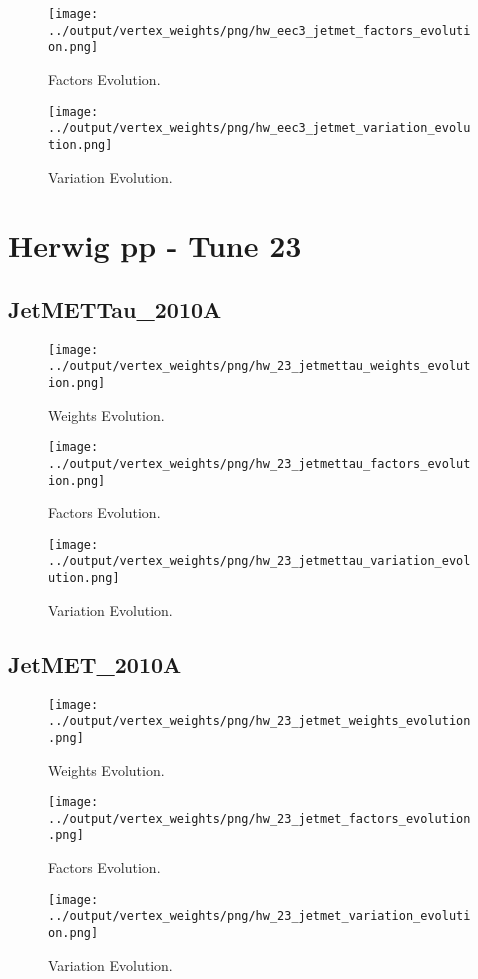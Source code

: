\documentclass[11pt]{book}
\begin{document}
\begin{figure}[ht]
\centering
\texttt{[image: ../output/vertex\_weights/png/hw\_eec3\_jetmet\_factors\_evolution.png]}
\caption{Factors Evolution.}
\end{figure}

\begin{figure}[ht]
\centering
\texttt{[image: ../output/vertex\_weights/png/hw\_eec3\_jetmet\_variation\_evolution.png]}
\caption{Variation Evolution.}
\end{figure}
\clearpage


\section{Herwig pp - Tune 23}
\subsection{JetMETTau\_2010A}
\begin{figure}[ht]
\centering
\texttt{[image: ../output/vertex\_weights/png/hw\_23\_jetmettau\_weights\_evolution.png]}
\caption{Weights Evolution.}
\end{figure}

\begin{figure}[ht]
\centering
\texttt{[image: ../output/vertex\_weights/png/hw\_23\_jetmettau\_factors\_evolution.png]}
\caption{Factors Evolution.}
\end{figure}

\begin{figure}[ht]
\centering
\texttt{[image: ../output/vertex\_weights/png/hw\_23\_jetmettau\_variation\_evolution.png]}
\caption{Variation Evolution.}
\end{figure}
\clearpage


\subsection{JetMET\_2010A}
\begin{figure}[ht]
\centering
\texttt{[image: ../output/vertex\_weights/png/hw\_23\_jetmet\_weights\_evolution.png]}
\caption{Weights Evolution.}
\end{figure}

\begin{figure}[ht]
\centering
\texttt{[image: ../output/vertex\_weights/png/hw\_23\_jetmet\_factors\_evolution.png]}
\caption{Factors Evolution.}
\end{figure}

\begin{figure}[ht]
\centering
\texttt{[image: ../output/vertex\_weights/png/hw\_23\_jetmet\_variation\_evolution.png]}
\caption{Variation Evolution.}
\end{figure}
\clearpage



 
\end{document}
